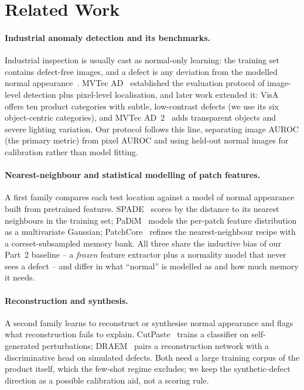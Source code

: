 \section{Related Work}
\label{sec:related}

\paragraph{Industrial anomaly detection and its benchmarks.}
Industrial inspection is usually cast as normal-only learning: the training set contains
defect-free images, and a defect is any deviation from the modelled normal
appearance~\cite{bergmann2019mvtec}. MVTec AD~\cite{bergmann2019mvtec} established the
evaluation protocol of image-level detection plus pixel-level localisation, and later work
extended it: VisA~\cite{zou2022spot} offers ten product categories with subtle, low-contrast
defects (we use its six object-centric categories), and MVTec AD~2~\cite{hecklerkram2026mvtec2}
adds transparent objects and severe lighting variation. Our protocol follows this line,
separating image AUROC (the primary metric) from pixel AUROC and using held-out normal images
for calibration rather than model fitting.

\paragraph{Nearest-neighbour and statistical modelling of patch features.}
A first family compares each test location against a model of normal appearance built from
pretrained features. SPADE~\cite{cohen2021spade} scores by the distance to its nearest
neighbours in the training set; PaDiM~\cite{defard2021padim} models the per-patch feature
distribution as a multivariate Gaussian; PatchCore~\cite{roth2022patchcore} refines the
nearest-neighbour recipe with a coreset-subsampled memory bank. All three share the inductive
bias of our Part~2 baseline -- a \emph{frozen} feature extractor plus a normality model that
never sees a defect -- and differ in what ``normal'' is modelled as and how much memory it
needs.

\paragraph{Reconstruction and synthesis.}
A second family learns to reconstruct or synthesise normal appearance and flags what
reconstruction fails to explain. CutPaste~\cite{li2021cutpaste} trains a classifier on
self-generated perturbations; DRAEM~\cite{zavrtanik2021draem} pairs a reconstruction network
with a discriminative head on simulated defects. Both need a large training corpus of the
product itself, which the few-shot regime excludes; we keep the synthetic-defect direction as
a possible calibration aid, not a scoring rule.

